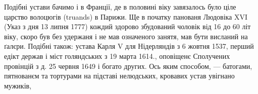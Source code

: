 Подібні устави бачимо і в Франції, де в половині 
віку завязалось було ціле царство волоцюгів (truands) в Парижи.
Ще в початку панованя Людовіка XVI (Указ з дня
13 липня 1777) кождий здорово збудований чоловік від 16
до 60 літ віку, скоро був без удержаня і не мав означеного
занятя, мав бути висланий на ґалєри. Подібні також: устава
Карля V для Нідерляндів з 6 жовтня 1537, перший едікт
держав і міст голяндських з 19 марта 1614., оповіщенє Сполучених
провінцій з д. 25 червня 1649 і богато других.
Ось яким способом, — батогами, пятнованєм та тортурами
на підставі нелюдських, кровавих устав увігнано мужиків,
\parbreak{}
